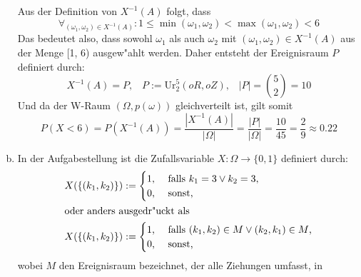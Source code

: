 \documentclass[10pt, oneside]{article}
\begin{document}
\begin{enumerate}[(a)]
        Aus der Definition von $X^{-1}(A)$ folgt, dass
        \begin{equation*}
            \forall_{(\omega_1, \omega_2) \in X^{-1}(A)} : 1 \leq \min(\omega_1, \omega_2) < \max(\omega_1, \omega_2) < 6
        \end{equation*}
        Das bedeutet also, dass sowohl $\omega_1$ als auch $\omega_2$ mit $(\omega_1, \omega_2) \in X^{-1}(A)$ aus der Menge [1, 6)
        ausgew"ahlt werden. Daher entsteht der Ereignisraum $P$ definiert durch:
        \begin{equation*}
            X^{-1}(A) = P\text{,} \quad P := \text{Ur}_2^5(oR, oZ)\text{,} \quad |P| = \binom{5}{2} = 10
        \end{equation*}
        Und da der W-Raum $(\Omega, p(\omega))$ gleichverteilt ist, gilt somit
        \begin{equation*}
            P(X < 6) = P(X^{-1}(A)) = \dfrac{|X^{-1}(A)|}{|\Omega|} = \dfrac{|P|}{|\Omega|} = \dfrac{10}{45} = \dfrac{2}{9} \approx 0.22
        \end{equation*}
    \item %
        In der Aufgabestellung ist die Zufallsvariable $X: \Omega \rightarrow \{0, 1\}$ definiert durch:
        \begin{align*}
            X(\{(k_1, k_2)\}) &:= \begin{cases}
                1\text{,}& \text{ falls } k_1 = 3 \lor k_2 = 3\text{,} \\
                0\text{,}& \text{ sonst, }
            \end{cases}  \\
            \intertext{oder anders ausgedr"uckt als}
            X(\{(k_1, k_2)\}) &:= \begin{cases}
                1\text{,}& \text{ falls } (k_1, k_2) \in M \lor (k_2, k_1) \in M\text{,} \\
                0\text{,}& \text{ sonst, }
            \end{cases}
        \end{align*}
        wobei $M$ den Ereignisraum bezeichnet, der alle Ziehungen umfasst, in

\end{enumerate}
\end{document}
